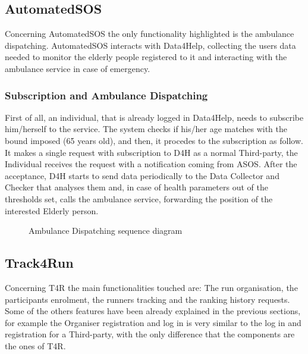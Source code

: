 \subsection{AutomatedSOS}

Concerning AutomatedSOS the only functionality highlighted is the ambulance dispatching.
AutomatedSOS interacts with Data4Help, collecting the users data needed to monitor the elderly people registered to it and interacting with the ambulance service in case of emergency.

\subsubsection{Subscription and Ambulance Dispatching}
First of all, an individual, that is already logged in Data4Help, needs to subscribe him/herself to the service. The system checks if his/her age matches with the bound imposed (65 years old), and then, it procedes to the subscription as follow. It makes a single request with subscription to D4H as a normal Third-party, the Individual receives the request with a notification coming from ASOS. After the acceptance, D4H starts to send data periodically to the Data Collector and Checker that analyses them and, in case of health parameters out of the thresholds set, calls the ambulance service, forwarding the position of the interested Elderly person.

\begin{figure}[H]
    \centering
    \caption{Ambulance Dispatching sequence diagram}
    \label{fig:log&regDiagram}
\end{figure}

\subsection{Track4Run}
Concerning T4R the main functionalities touched are: The run organisation, the participants enrolment, the runners tracking and the ranking history requests.
Some of the others features have been already explained in the previous sections, for example the Organiser registration and log in is very similar to the log in and registration for a Third-party, with the only difference that the components are the ones of T4R.

